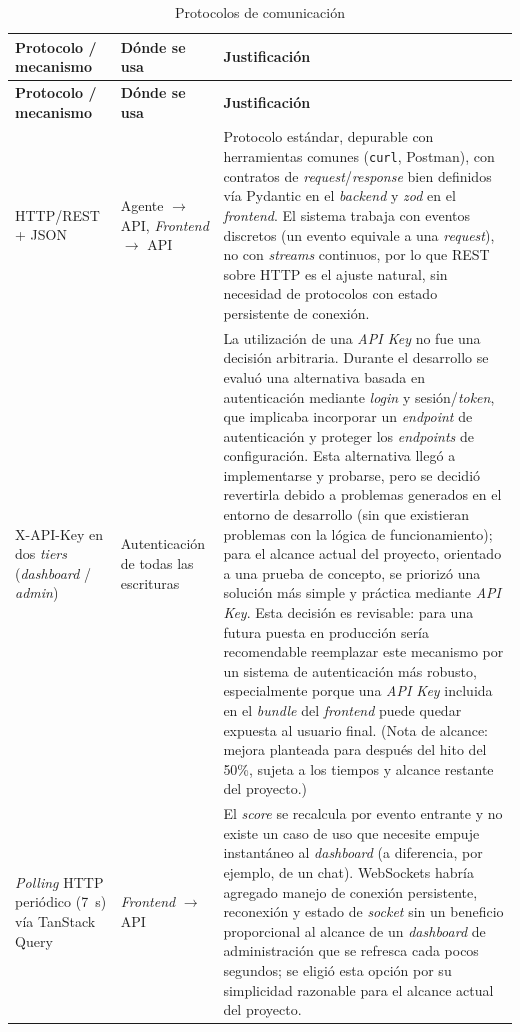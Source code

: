 \begin{longtable}{p{3cm}p{3.5cm}p{8.1cm}}
	\caption{Protocolos de comunicación}
	\label{tab:protocolos}\\
	\hline
	\textbf{Protocolo / mecanismo} & \textbf{Dónde se usa} & \textbf{Justificación} \\
	\hline
	\endfirsthead
	\hline
	\textbf{Protocolo / mecanismo} & \textbf{Dónde se usa} & \textbf{Justificación} \\
	\hline
	\endhead
	HTTP/REST + JSON & Agente $\rightarrow$ API, \emph{Frontend} $\rightarrow$ API & Protocolo estándar, depurable con herramientas comunes (\texttt{curl}, Postman), con contratos de \emph{request}/\emph{response} bien definidos vía Pydantic en el \emph{backend} y \emph{zod} en el \emph{frontend}. El sistema trabaja con eventos discretos (un evento equivale a una \emph{request}), no con \emph{streams} continuos, por lo que REST sobre HTTP es el ajuste natural, sin necesidad de protocolos con estado persistente de conexión. \\
	\hline
	X-API-Key en dos \emph{tiers} (\emph{dashboard} / \emph{admin}) & Autenticación de todas las escrituras & La utilización de una \emph{API Key} no fue una decisión arbitraria. Durante el desarrollo se evaluó una alternativa basada en autenticación mediante \emph{login} y sesión/\emph{token}, que implicaba incorporar un \emph{endpoint} de autenticación y proteger los \emph{endpoints} de configuración. Esta alternativa llegó a implementarse y probarse, pero se decidió revertirla debido a problemas generados en el entorno de desarrollo (sin que existieran problemas con la lógica de funcionamiento); para el alcance actual del proyecto, orientado a una prueba de concepto, se priorizó una solución más simple y práctica mediante \emph{API Key}. Esta decisión es revisable: para una futura puesta en producción sería recomendable reemplazar este mecanismo por un sistema de autenticación más robusto, especialmente porque una \emph{API Key} incluida en el \emph{bundle} del \emph{frontend} puede quedar expuesta al usuario final. (Nota de alcance: mejora planteada para después del hito del 50\%, sujeta a los tiempos y alcance restante del proyecto.) \\
	\hline
	\emph{Polling} HTTP periódico (7~s) vía TanStack Query & \emph{Frontend} $\rightarrow$ API & El \emph{score} se recalcula por evento entrante y no existe un caso de uso que necesite empuje instantáneo al \emph{dashboard} (a diferencia, por ejemplo, de un chat). WebSockets habría agregado manejo de conexión persistente, reconexión y estado de \emph{socket} sin un beneficio proporcional al alcance de un \emph{dashboard} de administración que se refresca cada pocos segundos; se eligió esta opción por su simplicidad razonable para el alcance actual del proyecto. \\

\end{longtable}

